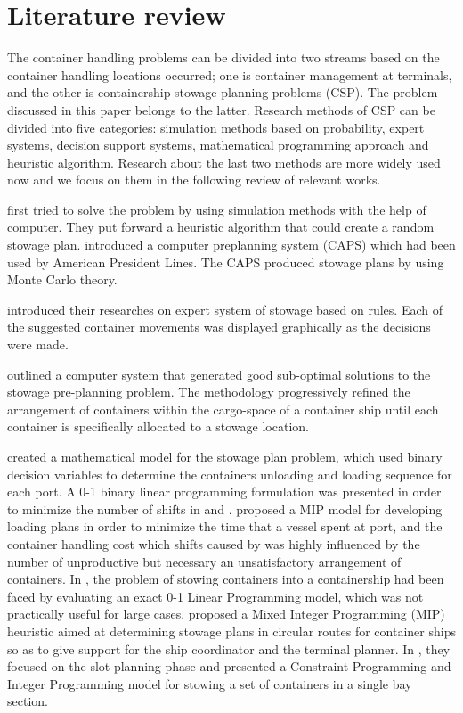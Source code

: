 \documentclass[review,3p,times,authoryear,12pt]{elsarticle}
\begin{document}
\section{Literature review}
\label{sec:lr}
The container handling problems can be divided into two streams based on the container handling locations occurred; one is container management at terminals, and the other is containership stowage planning problems (CSP).
The problem discussed in this paper belongs to the latter.
Research methods of CSP can be divided into five categories: simulation methods based on probability, expert systems, decision support systems, mathematical programming approach and heuristic algorithm. Research about the last two methods are more widely used now and we focus on them in the following review of relevant works.

\cite{webster1970container} first tried to solve the problem by using simulation methods with the help of computer.
They put forward a heuristic algorithm that could create a random stowage plan.
\cite{shields1984containership} introduced a computer preplanning system (CAPS) which had been used by American President Lines.
The CAPS produced stowage plans by using Monte Carlo theory.

\cite{dillingham1986application} introduced their researches on expert system of stowage based on rules.
Each of the suggested container movements was displayed graphically as the decisions were made.

\cite{wilson2001container} outlined a computer system that generated good sub-optimal solutions to the stowage pre-planning problem.
The methodology progressively refined the arrangement of containers within the cargo-space of a container ship until each container is specifically allocated to a stowage location.

\cite{botter1991stowage} created a mathematical model for the stowage plan problem, which used binary decision variables to determine the containers unloading and loading sequence for each port.
A 0-1 binary linear programming formulation was presented in order to minimize the number of shifts in \cite{avriel1998stowage} and \cite{avriel2000container}.
\cite{haghani2001model} proposed a MIP model for developing loading plans in order to minimize the time that a vessel spent at port, and the container handling cost which shifts caused by was highly influenced by the number of unproductive but necessary an unsatisfactory arrangement of containers.
In \cite{ambrosino2004stowing}, the problem of stowing containers into a containership had been faced by evaluating an exact 0-1 Linear Programming model, which was not practically useful for large cases.
\cite{ambrosino2015mip} proposed a Mixed  Integer  Programming (MIP) heuristic aimed at determining stowage plans in circular routes for container ships so as to give support for the ship coordinator and the terminal planner.
In \cite{parreno2016grasp}, they focused on the slot planning phase and presented a Constraint Programming and Integer Programming model for stowing a set of containers in a single bay section.
\end{document}
